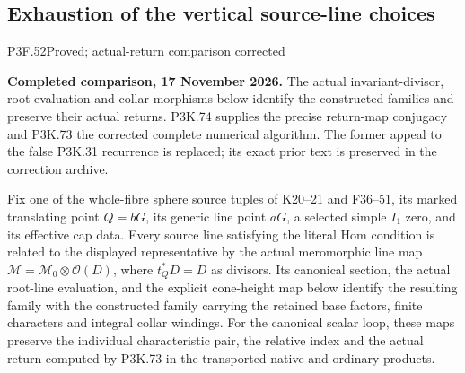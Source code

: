 \subsection{Exhaustion of the vertical source-line choices}
\begin{statement}{P3F.52}{Proved; actual-return comparison corrected}
\par\noindent\textbf{Completed comparison, 17 November 2026.}
The actual invariant-divisor, root-evaluation and collar morphisms
below identify the constructed families and preserve their actual
returns. P3K.74 supplies the precise return-map conjugacy and
P3K.73 the corrected complete numerical algorithm. The former
appeal to the false P3K.31 recurrence is replaced; its exact prior
text is preserved in the correction archive.
\medskip


Fix one of the whole-fibre sphere source tuples of K20--21 and
F36--51, its marked translating point \(Q=bG\), its generic line
point \(aG\), a selected simple \(I_1\) zero, and its effective
cap data. Every source line satisfying the literal Hom condition
is related to the displayed representative by the actual
meromorphic line map \(\mathcal M=\mathcal M_0\otimes\mathcal O(D)\),
where \(t_Q^*D=D\) as divisors.
Its canonical section, the actual root-line evaluation, and the
explicit cone-height map below identify the resulting family
with the constructed family carrying the retained base factors,
finite characters and integral collar windings.
For the canonical scalar loop, these maps preserve the individual
characteristic pair, the relative index and the actual return
computed by P3K.73 in the transported native and ordinary products.
\end{statement}
